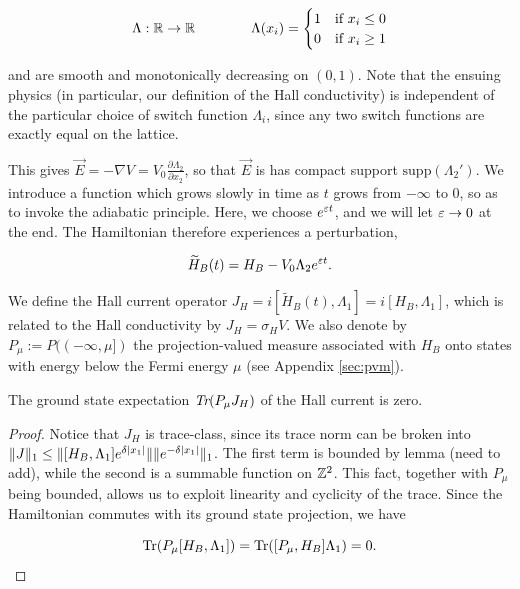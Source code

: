 \documentclass[12pt, letterpaper]{article}
\begin{document}
\[\Lambda : \mathbb{R}\to\mathbb{R} \quad\quad\quad\quad \Lambda(x_i) = \begin{cases} 1 & \text{if } x_i \leq 0 \\ 0 & \text{if } x_i \geq1\end{cases}\]

and are smooth and monotonically decreasing on $(0,1)$. Note that the ensuing physics (in particular, our definition of the Hall conductivity) is independent of the particular choice of switch function $\Lambda_i$, since any two switch functions are exactly equal on the lattice. 

This gives $\vec{E}=-\nabla V = V_0\frac{\partial \Lambda_2}{\partial x_2}$, so that $\vec{E}$ is has compact support $\text{supp}(\Lambda_2')$. We introduce a function which grows slowly in time as $t$ grows from $-\infty$ to 0, so as to invoke the adiabatic principle. Here, we choose $e^{\varepsilon t}$, and we will let $\varepsilon\to 0$ at the end. The Hamiltonian therefore experiences a perturbation, 

\[\widetilde{H}_B(t) = H_B - V_0\Lambda_2 e^{\varepsilon t}.\]

We define the Hall current operator $J_H = i[\widetilde{H}_B(t), \Lambda_1] = i[H_B,\Lambda_1]$, which is related to the Hall conductivity by $J_H = \sigma_H V$. We also denote by $P_\mu := P((-\infty,\mu])$ the projection-valued measure associated with $H_B$ onto states with energy below the Fermi energy $\mu$ (see Appendix \ref{sec:pvm}).

\begin{lemma}
The ground state expectation $\emph{Tr}(P_\mu J_H)$ of the Hall current is zero.
\label{lemma:groundstatecurrent}
\end{lemma}
\begin{proof}
Notice that $J_H$ is trace-class, since its trace norm can be broken into $\lVert J \rVert_1 \leq \lVert [H_B,\Lambda_1]e^{\delta|x_1|} \rVert\lVert e^{-\delta|x_1|} \rVert_1$. The first term is bounded by lemma (need to add), while the second is a summable function on $\mathbb{Z}^2$. This fact, together with $P_\mu$ being bounded, allows us to exploit linearity and cyclicity of the trace. Since the Hamiltonian commutes with its ground state projection, we have 

\[\text{Tr}(P_\mu [H_B, \Lambda_1]) = \text{Tr}([P_\mu, H_B] \Lambda_1) = 0.\]

\end{proof}
\end{document}
